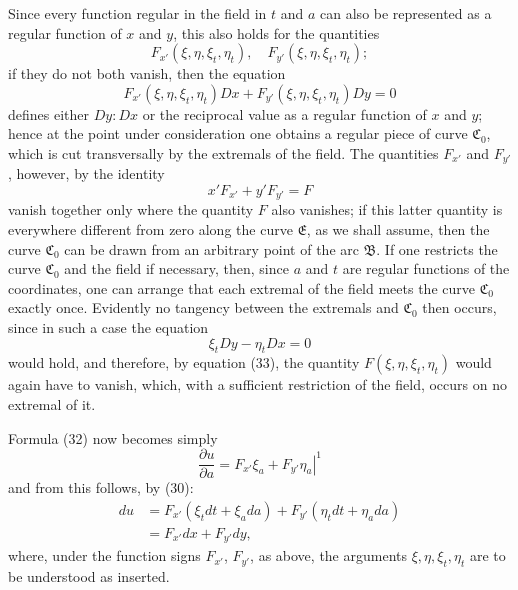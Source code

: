 \documentclass[11pt,a4paper,leqno]{article}
\begin{document}
Since every function regular in the field in $t$ and $a$ can also be represented as a regular function of $x$ and $y$, this also holds for the quantities
\[
F_{x'}(\xi,\eta,\xi_t,\eta_t),\quad F_{y'}(\xi,\eta,\xi_t,\eta_t);
\]
if they do not both vanish, then the equation
\begin{equation}\tag{33}
F_{x'}(\xi,\eta,\xi_t,\eta_t)Dx+F_{y'}(\xi,\eta,\xi_t,\eta_t)Dy=0
\end{equation}
defines either $Dy:Dx$ or the reciprocal value as a regular function of $x$ and $y$; hence at the point under consideration one obtains a regular piece of curve $\mathfrak{C}_0$, which is cut transversally by the extremals of the field. The quantities $F_{x'}$ and $F_{y'}$, however, by the identity
\[
x'F_{x'}+y'F_{y'}=F
\]
vanish together only where the quantity $F$ also vanishes; if this latter quantity is everywhere different from zero along the curve $\mathfrak{E}$, as we shall assume, then the curve $\mathfrak{C}_0$ can be drawn from an arbitrary point of the arc $\mathfrak{B}$. If one restricts the curve $\mathfrak{C}_0$ and the field if necessary, then, since $a$ and $t$ are regular functions of the coordinates, one can arrange that each extremal of the field meets the curve $\mathfrak{C}_0$ exactly once. Evidently no tangency between the extremals and $\mathfrak{C}_0$ then occurs, since in such a case the equation
\[
\xi_tDy-\eta_tDx=0
\]
would hold, and therefore, by equation (33), the quantity $F(\xi,\eta,\xi_t,\eta_t)$ would again have to vanish, which, with a sufficient restriction of the field, occurs on no extremal of it.

Formula (32) now becomes simply
\[
\frac{\partial u}{\partial a}=\left.F_{x'}\xi_a+F_{y'}\eta_a\right|^1
\]
and from this follows, by (30):
\begin{equation}\tag{34}
\begin{split}
du&=F_{x'}(\xi_tdt+\xi_a da)+F_{y'}(\eta_tdt+\eta_a da)\\
&=F_{x'}dx+F_{y'}dy,
\end{split}
\end{equation}
where, under the function signs $F_{x'}$, $F_{y'}$, as above, the arguments $\xi,\eta,\xi_t,\eta_t$ are to be understood as inserted.
\end{document}
